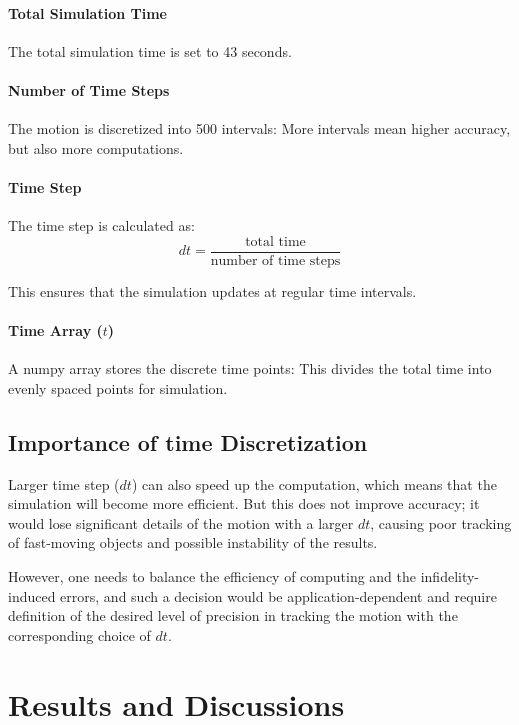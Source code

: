 \documentclass[a4paper,11pt]{article}
\begin{document}
\paragraph{Total Simulation Time}
The total simulation time is set to 43 seconds.

\paragraph{Number of Time Steps}
The motion is discretized into 500 intervals:
More intervals mean higher accuracy, but also more computations.

\paragraph{Time Step}
The time step is calculated as:
\begin{equation}
dt = \frac{\text{total time}}{\text{number of time steps}}
\end{equation}

This ensures that the simulation updates at regular time intervals.

\paragraph{Time Array ($t$)}
A numpy array stores the discrete time points:
This divides the total time into evenly spaced points for simulation.

\subsection*{Importance of time Discretization}
Larger time step ($dt$) can also speed up the computation, which means that the simulation will become more efficient. But this does not improve accuracy; it would lose significant details of the motion with a larger $dt$, causing poor tracking of fast-moving objects and possible instability of the results.

However, one needs to balance the efficiency of computing and the infidelity-induced errors, and such a decision would be application-dependent and require definition of the desired level of precision in tracking the motion with the corresponding choice of $dt$.

\section*{Results and Discussions}
\end{document}
